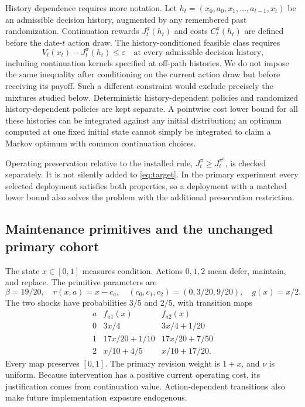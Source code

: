History dependence requires more notation. Let $h_t=(x_0,a_0,x_1,\ldots,a_{t-1},x_t)$ be an admissible decision history, augmented by any remembered past randomization. Continuation rewards $J_t^\pi(h_t)$ and costs $C_t^\pi(h_t)$ are defined before the date-$t$ action draw. The history-conditioned feasible class requires
\begin{equation}\label{eq:history}
 V_t(x_t)-J_t^\pi(h_t)\leq\varepsilon
 \quad\text{at every admissible decision history,}
\end{equation}
including continuation kernels specified at off-path histories. We do not impose the same inequality after conditioning on the current action draw but before receiving its payoff. Such a different constraint would exclude precisely the mixtures studied below. Deterministic history-dependent policies and randomized history-dependent policies are kept separate. A pointwise cost lower bound for all these histories can be integrated against any initial distribution; an optimum computed at one fixed initial state cannot simply be integrated to claim a Markov optimum with common continuation choices.

Operating preservation relative to the installed rule, $J_t^\pi\geq J_t^{\pi^0}$, is checked separately. It is not silently added to \eqref{eq:target}. In the primary experiment every selected deployment satisfies both properties, so a deployment with a matched lower bound also solves the problem with the additional preservation restriction.

\subsection{Maintenance primitives and the unchanged primary cohort}\label{sec:maintenance}
The state $x\in[0,1]$ measures condition. Actions $0,1,2$ mean defer, maintain, and replace. The primitive parameters are
\begin{equation}
 \beta=19/20,\quad r(x,a)=x-c_a,\quad
 (c_0,c_1,c_2)=(0,3/20,9/20),\quad g(x)=x/2.
\end{equation}
The two shocks have probabilities $3/5$ and $2/5$, with transition maps
\begin{equation}\label{eq:maps}
\begin{array}{c|cc}
 a&f_{a1}(x)&f_{a2}(x)\\\hline
 0&3x/4&3x/4+1/20\\
 1&17x/20+1/10&17x/20+7/50\\
 2&x/10+4/5&x/10+17/20.
\end{array}
\end{equation}
Every map preserves $[0,1]$. The primary revision weight is $1+x$, and $\nu$ is uniform. Because intervention has a positive current operating cost, its justification comes from continuation value. Action-dependent transitions also make future implementation exposure endogenous.

